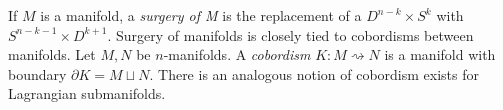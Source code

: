 
If $M$ is a manifold, a \emph{surgery of M} is the replacement of a $D^{n-k}\times S^k$ with $S^{n-k-1}\times D^{k+1}$. 
Surgery of manifolds is closely tied to cobordisms between manifolds. 
Let $M, N$ be $n$-manifolds. 
A \emph{cobordism} $K: M\rightsquigarrow N$ is a manifold with boundary $\partial K=M\sqcup N$. 
There is an analogous notion of cobordism exists for Lagrangian submanifolds.



